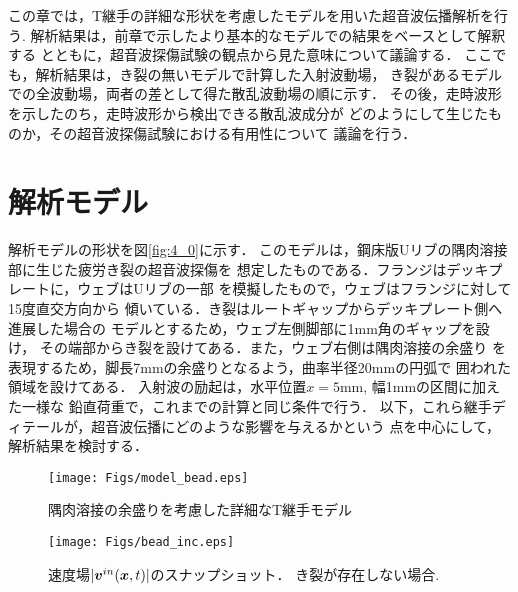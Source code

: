 ﻿%
この章では，T継手の詳細な形状を考慮したモデルを用いた超音波伝播解析を行う.
解析結果は，前章で示したより基本的なモデルでの結果をベースとして解釈する
とともに，超音波探傷試験の観点から見た意味について議論する．
ここでも，解析結果は，き裂の無いモデルで計算した入射波動場，
き裂があるモデルでの全波動場，両者の差として得た散乱波動場の順に示す．
その後，走時波形を示したのち，走時波形から検出できる散乱波成分が
どのようにして生じたものか，その超音波探傷試験における有用性について
議論を行う．
\section{解析モデル}
解析モデルの形状を図\ref{fig:4_0}に示す．
このモデルは，鋼床版Uリブの隅肉溶接部に生じた疲労き裂の超音波探傷を
想定したものである．フランジはデッキプレートに，ウェブはUリブの一部
を模擬したもので，ウェブはフランジに対して15度直交方向から
傾いている．き裂はルートギャップからデッキプレート側へ進展した場合の
モデルとするため，ウェブ左側脚部に1mm角のギャップを設け，
その端部からき裂を設けてある．また，ウェブ右側は隅肉溶接の余盛り
を表現するため，脚長7mmの余盛りとなるよう，曲率半径20mmの円弧で
囲われた領域を設けてある．
入射波の励起は，水平位置$x=5$mm, 幅1mmの区間に加えた一様な
鉛直荷重で，これまでの計算と同じ条件で行う．
以下，これら継手ディテールが，超音波伝播にどのような影響を与えるかという
点を中心にして，解析結果を検討する．
\begin{figure}[h]
	\begin{center}
	\texttt{[image: Figs/model\_bead.eps]} 
	\end{center}
	\caption{
		隅肉溶接の余盛りを考慮した詳細なT継手モデル
	} 
	\label{fig:fig4_0}
\end{figure}
\begin{figure}[h]
	\begin{center}
	\texttt{[image: Figs/bead\_inc.eps]} 
	\end{center}
	\caption{
		速度場$|\mbox{\boldmath $v$}^{in}(\mbox{\boldmath $x$},t)|$のスナップショット．
き裂が存在しない場合.
	} 
	\label{fig:fig4_1}
\end{figure}
